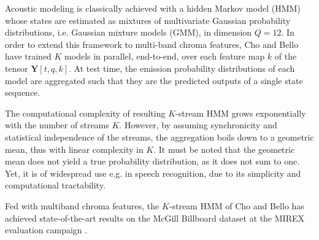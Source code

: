 \documentclass{article}
\makeatletter
\newcommand*{\eg}{e.g.\@\xspace}
\newcommand*{\ie}{i.e.\@\xspace}
\makeatother
\begin{document}
Acoustic modeling is classically achieved with a hidden Markov model (HMM)
whose states are estimated as mixtures of multivariate Gaussian probability
distributions, \ie Gaussian mixture models (GMM), in dimension $Q=12$.
In order to extend this framework to multi-band chroma features, Cho and Bello
have trained $K$ models in parallel, end-to-end, over each feature map $k$
of the tensor $\boldsymbol{Y}[t, q, k]$.
At test time, the emission probability distributions of each model
are aggregated such that they are the predicted outputs of a single state sequence.

The computational complexity of resulting $K$-stream HMM grows exponentially
with the number of streams $K$.
However, by assuming synchronicity and statistical independence of the streams,
the aggregation boils down to a geometric mean, thus with linear complexity in $K$.
It must be noted that the geometric mean does not yield a true probability distribution, as
it does not sum to one.
Yet, it is of widespread use \eg in speech recognition, due to its simplicity and computational
tractability.

Fed with multiband chroma features, the $K$-stream HMM of Cho and Bello
has achieved state-of-the-art results on the McGill Billboard dataset at the
MIREX evaluation campaign \cite{cho2013mirex}.

\end{document}
